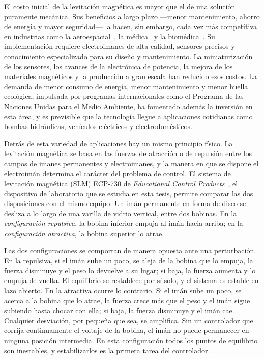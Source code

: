 El costo inicial de la levitación magnética es mayor que el de una solución puramente mecánica. Sus beneficios a largo plazo ---menor mantenimiento, ahorro de energía y mayor seguridad--- la hacen, sin embargo, cada vez más competitiva en industrias como la aeroespacial~\cite{bryton}, la médica~\cite{song} y la biomédica~\cite{sajjad}. Su implementación requiere electroimanes de alta calidad, sensores precisos y conocimiento especializado para su diseño y mantenimiento. La miniaturización de los sensores, los avances de la electrónica de potencia, la mejora de los materiales magnéticos y la producción a gran escala han reducido esos costos. La demanda de menor consumo de energía, menor mantenimiento y menor huella ecológica, impulsada por programas internacionales como el Programa de las Naciones Unidas para el Medio Ambiente, ha fomentado además la inversión en esta área, y es previsible que la tecnología llegue a aplicaciones cotidianas como bombas hidráulicas, vehículos eléctricos y electrodomésticos.

Detrás de esta variedad de aplicaciones hay un mismo principio físico. La levitación magnética se basa en las fuerzas de atracción o de repulsión entre los campos de imanes permanentes y electroimanes, y la manera en que se dispone el electroimán determina el carácter del problema de control. El sistema de levitación magnética (SLM) ECP-730 de \emph{Educational Control Products}~\cite{730}, el dispositivo de laboratorio que se estudia en esta tesis, permite comparar las dos disposiciones con el mismo equipo. Un imán permanente en forma de disco se desliza a lo largo de una varilla de vidrio vertical, entre dos bobinas. En la \emph{configuración repulsiva}, la bobina inferior empuja al imán hacia arriba; en la \emph{configuración atractiva}, la bobina superior lo atrae.

Las dos configuraciones se comportan de manera opuesta ante una perturbación. En la repulsiva, si el imán sube un poco, se aleja de la bobina que lo empuja, la fuerza disminuye y el peso lo devuelve a su lugar; si baja, la fuerza aumenta y lo empuja de vuelta. El equilibrio se restablece por sí solo, y el sistema es estable en lazo abierto. En la atractiva ocurre lo contrario. Si el imán sube un poco, se acerca a la bobina que lo atrae, la fuerza crece más que el peso y el imán sigue subiendo hasta chocar con ella; si baja, la fuerza disminuye y el imán cae. Cualquier desviación, por pequeña que sea, se amplifica. Sin un controlador que corrija continuamente el voltaje de la bobina, el imán no puede permanecer en ninguna posición intermedia. En esta configuración todos los puntos de equilibrio son inestables, y estabilizarlos es la primera tarea del controlador.

